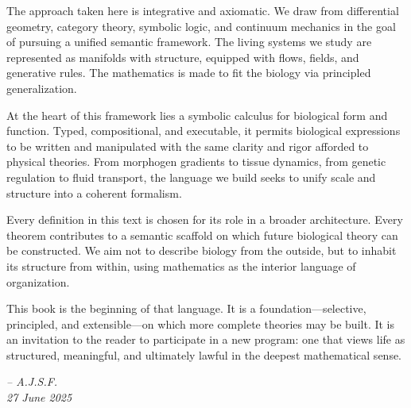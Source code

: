\documentclass[11pt,reqno]{amsart}
\begin{document}
The approach taken here is integrative and axiomatic. We draw from differential geometry, category theory, symbolic logic, and continuum mechanics in the goal of pursuing a unified semantic framework. The living systems we study are represented as manifolds with structure, equipped with flows, fields, and generative rules. The mathematics is made to fit the biology via principled generalization.

At the heart of this framework lies a symbolic calculus for biological form and function. Typed, compositional, and executable, it permits biological expressions to be written and manipulated with the same clarity and rigor afforded to physical theories. From morphogen gradients to tissue dynamics, from genetic regulation to fluid transport, the language we build seeks to unify scale and structure into a coherent formalism.

Every definition in this text is chosen for its role in a broader architecture. Every theorem contributes to a semantic scaffold on which future biological theory can be constructed. We aim not to describe biology from the outside, but to inhabit its structure from within, using mathematics as the interior language of organization.

This book is the beginning of that language. It is a foundation—selective, principled, and extensible—on which more complete theories may be built. It is an invitation to the reader to participate in a new program: one that views life as structured, meaningful, and ultimately lawful in the deepest mathematical sense.

\begin{flushright}
\textit{-- A.J.S.F. \\ 27 June 2025}
\end{flushright}
\pagebreak





%
%
%
%
%
%


\appendix

%
%
%


\newpage


\end{document}
